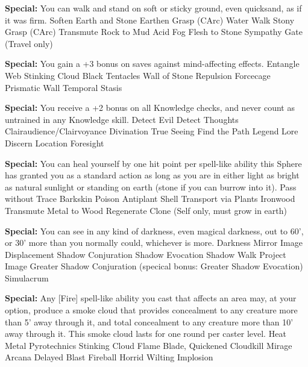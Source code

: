 \begin{multicols}{2}
\textbf{Special: }{You can walk and stand on soft or sticky ground, even quicksand, as if it was firm.}
\sphere
{Soften Earth and Stone}
{Earthen Grasp (CArc)}
{Water Walk}
{Stony Grasp (CArc)}
{Transmute Rock to Mud}
{Acid Fog}
{Flesh to Stone}
{Sympathy}
{Gate (Travel only)}

\textbf{Special: }{You gain a +3 bonus on saves against mind-affecting effects.}
\sphere
{Entangle}
{Web}
{Stinking Cloud}
{Black Tentacles}
{Wall of Stone}
{Repulsion}
{Forcecage}
{Prismatic Wall}
{Temporal Stasis}

\textbf{Special: }{You receive a +2 bonus on all Knowledge checks, and never count as untrained in any Knowledge skill.}
\sphere
{Detect Evil}
{Detect Thoughts}
{Clairaudience/Clairvoyance}
{Divination}
{True Seeing}
{Find the Path}
{Legend Lore}
{Discern Location}
{Foresight}

\textbf{Special: }{You can heal yourself by one hit point per spell-like ability this Sphere has granted you as a standard action as long as you are in either light as bright as natural sunlight or standing on earth (stone if you can burrow into it).}
\sphere
{Pass without Trace}
{Barkskin}
{Poison}
{Antiplant Shell}
{Transport via Plants}
{Ironwood}
{Transmute Metal to Wood}
{Regenerate}
{Clone (Self only, must grow in earth)}

\textbf{Special: }{You can see in any kind of darkness, even magical darkness, out to 60', or 30' more than you normally could, whichever is more.}
\sphere
{Darkness}
{Mirror Image}
{Displacement}
{Shadow Conjuration}
{Shadow Evocation}
{Shadow Walk}
{Project Image}
{Greater Shadow Conjuration (specical bonus: Greater Shadow Evocation)}
{Simulacrum}

\textbf{Special: }{Any [Fire] spell-like ability you cast that affects an area may, at your option, produce a smoke cloud that provides concealment to any creature more than 5' away through it, and total concealment to any creature more than 10' away through it. This smoke cloud lasts for one round per caster level.}
\sphere
{Heat Metal}
{Pyrotechnics}
{Stinking Cloud}
{Flame Blade, Quickened}
{Cloudkill}
{Mirage Arcana}
{Delayed Blast Fireball}
{Horrid Wilting}
{Implosion}


\end{multicols}
